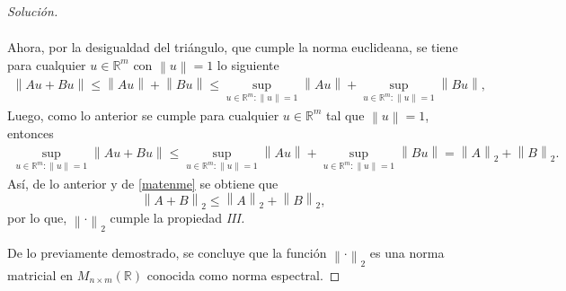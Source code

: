 \documentclass[10.5pt,notitlepage]{article}
\newenvironment{solucion}
  {\begin{proof}[Solución]}
  {\end{proof}}
\newcommand{\RR}{\mathbb{R}}
\newcommand{\norm}[1]{\left\| #1 \right\|}
\theoremstyle{plain}
\begin{document}
\begin{solucion}
\begin{itemize}
\begin{align}
    \end{align}
    Ahora, por la desigualdad del triángulo, que cumple la norma euclideana, se tiene para cualquier \(u \in \RR^m\) con \(\norm{u} = 1\) lo siguiente 
    \begin{align*}
        \norm{Au + Bu} \leq \norm{Au} + \norm{Bu} \leq \sup_{u\in \RR^{m}: \norm{u} = 1}\norm{Au} + \sup_{u\in \RR^{m}: \norm{u} = 1}\norm{Bu},
    \end{align*}
    Luego, como lo anterior se cumple para cualquier \(u \in \RR^m\) tal que \(\norm{u} = 1\), entonces
    \begin{align*}
        \sup_{u\in \RR^{m}: \norm{u} = 1}\norm{Au + Bu} \leq \sup_{u\in \RR^{m}: \norm{u} = 1}\norm{Au} + \sup_{u\in \RR^{m}: \norm{u} = 1}\norm{Bu} = \norm{A}_{2} + \norm{B}_{2}.
    \end{align*}
    Así, de lo anterior y de \eqref{matenme} se obtiene que 
    \[
     \norm{A + B}_{2} \leq \norm{A}_{2} + \norm{B}_{2},
    \]
    por lo que, \(\norm{\cdot}_{2}\) cumple la propiedad \textit{III.}  
\end{itemize}
De lo previamente demostrado, se concluye que la función \(\norm{\cdot}_{2}\) es una norma matricial en \(M_{n\times m}(\RR)\) conocida como norma espectral.
\end{solucion}
\end{document}
